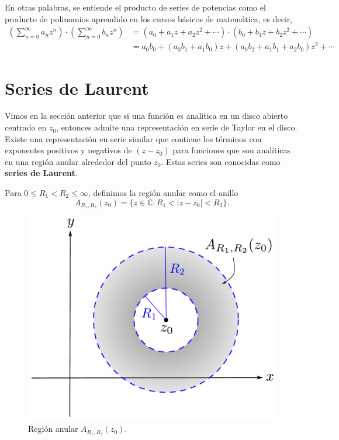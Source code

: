 En otras palabras, se entiende el producto de series de potencias como el producto de polinomios aprendido en los cursos básicos de matemática, es decir,
\begin{align*}
\left(\sum_{n=0}^{\infty} a_n z^n \right) \cdot \left(\sum_{n=0}^{\infty} b_n z^n \right) &= (a_0 + a_1 z + a_2 z^2 + \cdots ) \cdot (b_0 + b_1 z + b_2z^2 + \cdots) \\
&= a_0 b_0 + (a_0 b_1 + a_1 b_0) z + (a_0 b_2 + a_1 b_1 + a_2 b_0) z^2 + \cdots 
\end{align*} 

\section{Series de Laurent}

Vimos en la sección anterior que si una función es analítica en un disco abierto centrado en $z_0$, entonces admite una representación en serie de Taylor en el disco. Existe una representación en serie similar que contiene los términos con exponentes positivos y negativos de $(z-z_0)$ para funciones que son analíticas en una región anular alrededor del punto $z_0$. Estas series son conocidas como \textbf{series de Laurent}. 

Para $0 \leq R_1 < R_2 \leq \infty$, definimos la región anular como el anillo
$$A_{R_1,R_2}(z_0) = \{z \in \mathbb{C} : R_1 < |z-z_0| < R_2\}.$$

\begin{figure}[H]
    \centering
    \includegraphics[scale = 0.45]{Figuras/RegionAnular.pdf}
    \caption{Región anular $A_{R_1,R_2}(z_0)$.}
    \label{fig:Annulus}
\end{figure}

